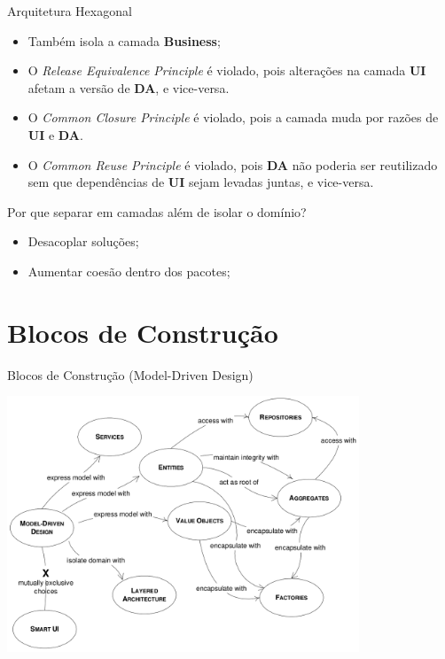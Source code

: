 \documentclass[aspectratio=169]{beamer}
\begin{document}
\begin{frame}{Arquitetura Hexagonal}			
	\begin{itemize}	
		\item Também isola a camada \textbf{Business};
		\item O \textit{Release Equivalence Principle} é violado, pois  alterações na camada \textbf{UI} afetam a versão de \textbf{DA}, e vice-versa. 
		\item O \textit{Common Closure Principle} é violado, pois a camada muda por razões de \textbf{UI} e \textbf{DA}. 
		\item O \textit{Common Reuse Principle} é violado, pois \textbf{DA} não poderia ser reutilizado sem que dependências de \textbf{UI} sejam levadas juntas, e vice-versa.
	\end{itemize}
\end{frame}

\begin{frame}{Por que separar em camadas além de isolar o domínio?}	
	\begin{itemize}	
		\item Desacoplar soluções;
		\item Aumentar coesão dentro dos pacotes;
	\end{itemize}
\end{frame}

\section{Blocos de Construção}
\begin{frame}{Blocos de Construção (Model-Driven Design)}	
	\begin{center}
		\includegraphics[width=10.5cm]{imgs/building_blocks}
	\end{center}
\end{frame}
\end{document}
